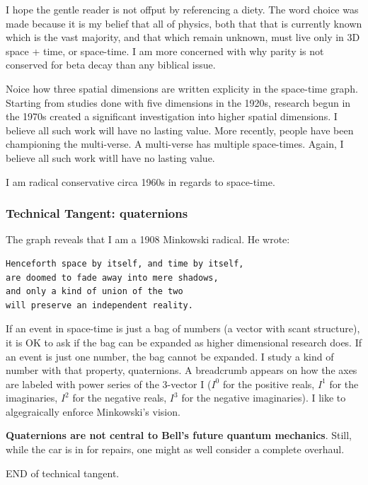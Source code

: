 I hope the gentle reader is not offput by referencing a diety. The word
choice was made because it is my belief that all of physics, both that
that is currently known which is the vast majority, and that which
remain unknown, must live only in 3D space + time, or space-time. I am
more concerned with why parity is not conserved for beta decay than any
biblical issue.

Noice how three spatial dimensions are written explicity in the
space-time graph. Starting from studies done with five dimensions in the
1920s, research begun in the 1970s created a significant investigation
into higher spatial dimensions. I believe all such work will have no
lasting value. More recently, people have been championing the
multi-verse. A multi-verse has multiple space-times. Again, I believe
all such work witll have no lasting value.

I am radical conservative circa 1960s in regards to space-time.

\hypertarget{technical-tangent-quaternions}{%
\subsubsection{Technical Tangent:
quaternions}\label{technical-tangent-quaternions}}

The graph reveals that I am a 1908 Minkowski radical. He wrote:

\begin{verbatim}
Henceforth space by itself, and time by itself, 
are doomed to fade away into mere shadows, 
and only a kind of union of the two 
will preserve an independent reality.
\end{verbatim}

If an event in space-time is just a bag of numbers (a vector with scant
structure), it is OK to ask if the bag can be expanded as higher
dimensional research does. If an event is just one number, the bag
cannot be expanded. I study a kind of number with that property,
quaternions. A breadcrumb appears on how the axes are labeled with power
series of the 3-vector I (\(I^0\) for the positive reals, \(I^1\) for
the imaginaries, \(I^2\) for the negative reals, \(I^3\) for the
negative imaginaries). I like to algegraically enforce Minkowski's
vision.

\textbf{Quaternions are not central to Bell's future quantum mechanics}.
Still, while the car is in for repairs, one might as well consider a
complete overhaul.

END of technical tangent.


